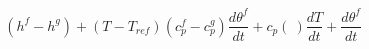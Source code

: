 \begin{equation}
(h^f-h^g) + (T- T_{ref}) (c_p^f-c_p^g)\frac{d\theta^f }{dt} + c_p(\ ) \frac{d T}{dt} +   \frac{d\theta^f }{dt}
\end{equation}